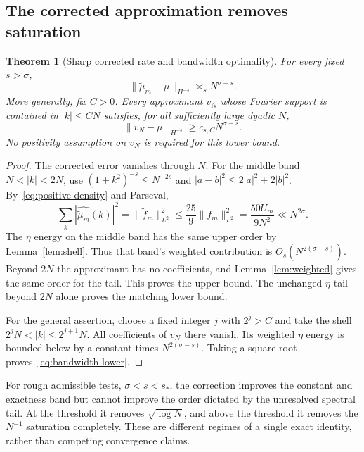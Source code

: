 \documentclass[11pt,a4paper]{article}
\numberwithin{equation}{section}
\newtheorem{theorem}{Theorem}[section]
\theoremstyle{definition}
\theoremstyle{remark}
\newcommand{\mt}{\widetilde\mu}
\newcommand{\ft}{\widetilde f}
\newcommand{\norm}[1]{\lVert #1\rVert}
\begin{document}
\subsection{The corrected approximation removes saturation}
\begin{theorem}[Sharp corrected rate and bandwidth optimality]
\label{thm:corrected-rate}
For every fixed $s>\sigma$,
\begin{equation}
 \boxed{\quad
 \norm{\mt_m-\mu}_{H^{-s}}\asymp_s N^{\sigma-s}.
 \quad}
 \label{eq:corrected-rates}
\end{equation}
More generally, fix $C>0$. Every approximant $v_N$ whose Fourier support is
contained in $|k|\le CN$ satisfies, for all sufficiently large dyadic $N$,
\begin{equation}
 \norm{v_N-\mu}_{H^{-s}}\ge c_{s,C}N^{\sigma-s}.
 \label{eq:bandwidth-lower}
\end{equation}
No positivity assumption on $v_N$ is required for this lower bound.
\end{theorem}
\begin{proof}
The corrected error vanishes through $N$. For the middle band $N<|k|<2N$,
use $(1+k^2)^{-s}\le N^{-2s}$ and
$|a-b|^2\le2|a|^2+2|b|^2$. By~\eqref{eq:positive-density} and Parseval,
\[
 \sum_k|\widehat{\mt_m}(k)|^2
 =\norm{\ft_m}_{L^2}^2
 \le\frac{25}{9}\norm{f_m}_{L^2}^2
 =\frac{50U_m}{9N^2}\ll N^{2\sigma}.
\]
The $\eta$ energy on the middle band has the same upper order by
Lemma~\ref{lem:shell}. Thus that band's weighted contribution is
$O_s(N^{2(\sigma-s)})$. Beyond $2N$ the approximant has no coefficients, and
Lemma~\ref{lem:weighted} gives the same order for the tail. This proves the
upper bound. The unchanged $\eta$ tail beyond $2N$ alone proves the matching
lower bound.

For the general assertion, choose a fixed integer $j$ with $2^j>C$ and take the
shell $2^jN<|k|\le2^{j+1}N$. All coefficients of $v_N$ there vanish. Its
weighted $\eta$ energy is bounded below by a constant times
$N^{2(\sigma-s)}$. Taking a square root proves~\eqref{eq:bandwidth-lower}.
\end{proof}

For rough admissible tests, $\sigma<s<s_*$, the correction improves the constant
and exactness band but cannot improve the order dictated by the unresolved
spectral tail. At the threshold it removes $\sqrt{\log N}$, and above the
threshold it removes the $N^{-1}$ saturation completely. These are different
regimes of a single exact identity, rather than competing convergence claims.
\end{document}
